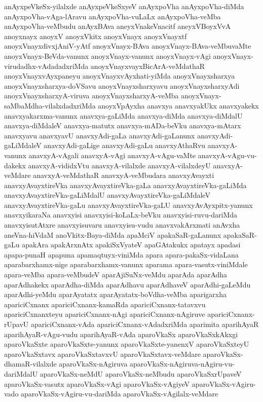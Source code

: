 {anAyxpeVkeSx-yilalxde
anAyxpeVkeSxyeV
anAyxpoVha
anAyxpoVha-diMda
anAyxpoVha-vAga-lAravu
anAyxpoVha-vuLaLx
anAyxpoVha-veMba
anAyxpoVha-veMbudu
anAyxBAva
aneyxVnakeVnacitf
aneyxVBoyxVvA
anoyxnayx
anoyxV
anoyxVkitx
anoyxVnayx
anoyxVnayxtf
anoyxVnayxdivxjAniV-yAtf
anoyxVnayx-BAva
anoyxVnayx-BAva-veMbuvaMte
anoyxVnayx-BeVda-vanunx
anoyxVnayx-vanunx
anoyxVnayx-vAgi
anoyxVnayx-virudadhx-vAdadadxriMda
anoyxVnayxvayxBicArA-veMdathaR
anoyxVnayxvAyxpaneyu
anoyxVnayxvAyxhati-yiMda
anoyxVnayxsharxya
anoyxVnayxsharxya-doVSavu
anoyxVnayxsharxyavu
anoyxVnayxsharxyAdi
anoyxVnayxsharxyA-viruva
anoyxVnayxsharxyA-veMba
anoyxVnayx-saMbaMdha-vilalxdadxriMda
anoyxVpAyxha
anavxya
anavxyakUkx
anavxyakekx
anavxyakarxma-vanunx
anavxya-gaLiMda
anavxya-diMda
anavxya-diMdalU
anavxya-diMdaleV
anavxya-matutx
anavxya-mADa-beVku
anavxya-mAtarx
anavxyavu
anavxyavU
anavxyAdi-gaLa
anavxyAdi-gaLanunx
anavxyAdi-gaLiMdaleV
anavxyAdi-gaLige
anavxyAdi-gaLu
anavxyAthaRvu
anavxyA-vanunx
anavxyA-vAgali
anavxyA-vAgi
anavxyA-vAgu-vaMte
anavxyA-vAgu-vu-dakekx
anavxyA-vididxVtu
anavxyA-vilalxde
anavxyA-vilalxdeyU
anavxyA-veMdare
anavxyA-veMdathaR
anavxyA-veMbudara
anavxyAvayxti
anavxyAvayxtireVka
anavxyAvayxtireVka-gaLa
anavxyAvayxtireVka-gaLiMda
anavxyAvayxtireVka-gaLiMdalU
anavxyAvayxtireVka-gaLiMdaleV
anavxyAvayxtireVka-gaLu
anavxyAvayxtireVka-gaLU
anavxyAvAyxpitx-yanunx
anavxyikaraNa
anavxyisi
anavxyisi-koLaLx-beVku
anavxyisi-ruvu-dariMda
anavxyisutAtxre
anavxyisuvaru
anavxyisu-vudu
anavxvakArxmati
anAvxha
aneVna-hiVdaM
anoVkitx-Baya-diMda
apaMciV
apakaSaR-gaLanunx
apakaSaR-gaLu
apakAra
apakArxnAtx
apakiSxVyateV
apaGAtakukx
apatayx
apadasi
apapa-punaH
apapuna
apamaqtuyx-viniMda
apara
apara-pakaSx-vidaLana
aparabarxhamx-nige
aparabarxhamx-vanunx
aparama
apara-vasutx-viniMdale
apara-veMba
apara-veMbudeV
aparAjiSuNx-veMdu
aparAda
aparAdha
aparAdhakekx
aparAdha-diMda
aparAdhavu
aparAdhaveV
aparAdhi-gaLeMdu
aparAdhi-yeMdu
aparAyatatx
aparAyatatx-boVdha-veMba
aparigarxha
apariciCxnanx
apariciCxnanx-kamaRda
apariciCxnanx-tatavxvu
apariciCxnanxteyu
apariciCxnanx-nAgi
apariciCxnanx-nAgiruve
apariciCxnanx-rUpavU
apariciCxnanx-vAda
apariciCxnanx-vAdadxriMda
aparimita
aparihAyaR
aparihAyaR-vAgu-vudu
aparihAyaR-vAda
aparoVkaSx
aparoVkaSxkAkxgi
aparoVkaSxte
aparoVkaSxte-yanunx
aparoVkaSxte-yanenxV
aparoVkaSxteyU
aparoVkaSxtavx
aparoVkaSxtavxvU
aparoVkaSxtavx-veMdare
aparoVkaSx-dhamaR-vilalxde
aparoVkaSx-nAgiruva
aparoVkaSx-nAgiruva-nAgiru-vu-dariMdalU
aparoVkaSx-neMdU
aparoVkaSx-neMbudu
aparoVkaSxrUpaveV
aparoVkaSx-vasutx
aparoVkaSx-vAgi
aparoVkaSx-vAgiyeV
aparoVkaSx-vAgiru-vado
aparoVkaSx-vAgiru-vu-dariMda
aparoVkaSx-vAgilalx-veMdare
}
